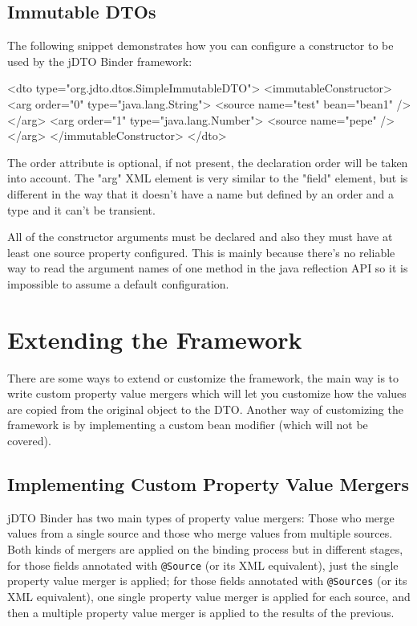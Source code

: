 \documentclass[11pt]{article}
\newcommand{\JDTO}{jDTO Binder\xspace}
\begin{document}
\subsection{Immutable DTOs}

The following snippet demonstrates how you can configure a constructor to be used by the \JDTO framework:

\begin{xml}
<dto type="org.jdto.dtos.SimpleImmutableDTO">
    <immutableConstructor>
        <arg order="0" type="java.lang.String">
            <source name="test" bean="bean1" />
        </arg>
        <arg order="1" type="java.lang.Number">
            <source name="pepe" />
        </arg>
    </immutableConstructor>
</dto>
\end{xml}

The order attribute is optional, if not present, the declaration order will be taken into account. The "arg" XML element is very similar to the "field" element, but is different in the way that it doesn't have a name but defined by an order and a type and it can't be transient. 

All of the constructor arguments must be declared and also they must have at least one source property configured. This is mainly because there's no reliable way to read the argument names of one method in the java reflection API so it is impossible to assume a default configuration.


\clearpage

\section{Extending the Framework}

There are some ways to extend or customize the framework, the main way is to write custom property value mergers which will let you customize how the values are copied from the original object to the DTO. Another way of customizing the framework is by implementing a custom bean modifier (which will not be covered). 


\subsection{Implementing Custom Property Value Mergers}

\JDTO has two main types of property value mergers: Those who merge values from a single source and those who merge values from multiple sources. Both kinds of mergers are applied on the binding process but in different stages, for those fields annotated with \texttt{@Source} (or its XML equivalent), just the single property value merger is applied; for those fields annotated with \texttt{@Sources} (or its XML equivalent), one single property value merger is applied for each source, and then a multiple property value merger is applied to the results of the previous.
\end{document}
